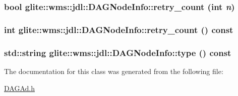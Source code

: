 \hypertarget{classglite_1_1wms_1_1jdl_1_1DAGNodeInfo_a16}{
\subsubsection[retry\_\-count]{\setlength{\rightskip}{0pt plus 5cm}bool glite::wms::jdl::DAGNode\-Info::retry\_\-count (int {\em n})}}
\label{classglite_1_1wms_1_1jdl_1_1DAGNodeInfo_a16}


\hypertarget{classglite_1_1wms_1_1jdl_1_1DAGNodeInfo_a15}{
\subsubsection[retry\_\-count]{\setlength{\rightskip}{0pt plus 5cm}int glite::wms::jdl::DAGNode\-Info::retry\_\-count () const}}
\label{classglite_1_1wms_1_1jdl_1_1DAGNodeInfo_a15}


\hypertarget{classglite_1_1wms_1_1jdl_1_1DAGNodeInfo_a10}{
\subsubsection[type]{\setlength{\rightskip}{0pt plus 5cm}std::string glite::wms::jdl::DAGNode\-Info::type () const}}
\label{classglite_1_1wms_1_1jdl_1_1DAGNodeInfo_a10}




The documentation for this class was generated from the following file:\begin{CompactItemize}
\item 
\hyperlink{DAGAd_8h}{DAGAd.h}\end{CompactItemize}
